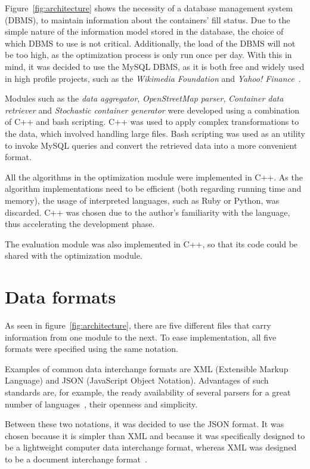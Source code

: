 Figure~\ref{fig:architecture} shows the necessity of a database management
system (DBMS), to maintain information about the containers' fill status. Due to
the simple nature of the information model stored in the database, the choice of
which DBMS to use is not critical. Additionally, the load of the DBMS will not
be too high, as the optimization process is only run once per day. With this in
mind, it was decided to use the MySQL DBMS, as it is both free and widely used
in high profile projects, such as the \textit{Wikimedia Foundation} and
\textit{Yahoo! Finance}~\citep{Balanescu2008}.

Modules such as the \textit{data aggregator}, \textit{OpenStreetMap parser},
\textit{Container data retriever} and \textit{Stochastic container generator}
were developed using a combination of C++ and bash scripting. C++ was used to
apply complex transformations to the data, which involved handling large files.
Bash scripting was used as an utility to invoke MySQL queries and convert the
retrieved data into a more convenient format.

All the algorithms in the optimization module were implemented in C++. As the
algorithm implementations need to be efficient (both regarding running time and
memory), the usage of interpreted languages, such as Ruby or Python, was
discarded. C++ was chosen due to the author's familiarity with the language,
thus accelerating the development phase.

The evaluation module was also implemented in C++, so that its code could be
shared with the optimization module.

\section{Data formats}
\label{section:formats}

As seen in figure~\ref{fig:architecture}, there are five different files that
carry information from one module to the next. To ease implementation, all five
formats were specified using the same notation.

Examples of common data interchange formats are XML (Extensible Markup
Language) and JSON (JavaScript Object Notation). Advantages of such standards
are, for example, the ready availability of several parsers for a great number
of languages~\citep{site:json,site:xml}, their openness and simplicity.

Between these two notations, it was decided to use the JSON format. It was
chosen because it is simpler than XML and because it was specifically designed
to be a lightweight computer data interchange format, whereas XML was designed
to be a document interchange format~\citep{site:json}.

